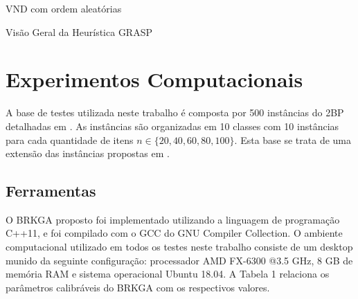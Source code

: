 \documentclass[article]{rian_article}
\begin{document}
\begin{algorithm}[htbp]
\caption{VND com ordem aleatórias}
\label{alg:rvnd}
\footnotesize
\begin{algorithmic}[1]
 \Repeat 
  \Else
  \EndIf
\EndProcedure
\end{algorithmic}
\end{algorithm}

\begin{algorithm}[htbp]
\caption{Visão Geral da Heurística GRASP}
\label{alg:geral}
\begin{algorithmic}[1]
\footnotesize
{}
 \State{$\mu^{\ast} \gets \infty$}
 \Repeat 
   
   
  \EndIf
\EndProcedure
\end{algorithmic}
\end{algorithm}

\section{Experimentos Computacionais}
A base de testes utilizada neste trabalho é composta por 500 instâncias do 2BP detalhadas em \citet{martello1998}. As instâncias são organizadas em 10 classes com 10 instâncias para cada quantidade de itens ${n} \in \{20, 40, 60, 80, 100\}$. Esta base se trata de uma extensão das instâncias propostas em \citet{wang1987}.

\subsection{Ferramentas}\label{sec::ferramentas}

O BRKGA proposto foi implementado utilizando a linguagem de programação C++11, e foi compilado com o GCC do GNU Compiler Collection. O ambiente computacional utilizado em todos os testes neste trabalho consiste de um desktop munido da seguinte configuração: processador AMD FX-6300 @3.5 GHz, 8 GB de memória RAM e sistema operacional Ubuntu 18.04. A Tabela 1 relaciona os parâmetros calibráveis do BRKGA com os respectivos valores.
\end{document}
